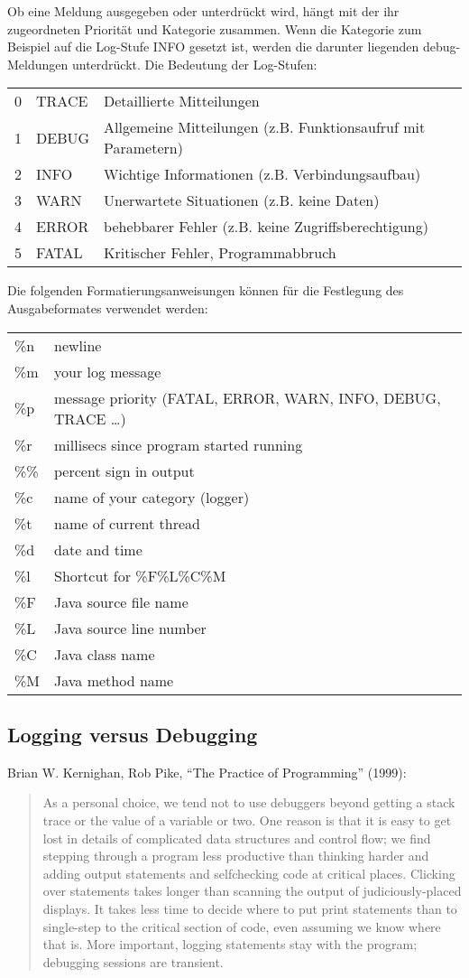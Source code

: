 Ob eine Meldung ausgegeben oder unterdrückt wird, hängt mit der ihr
zugeordneten Priorität und Kategorie zusammen. Wenn die Kategorie zum Beispiel
auf die Log-Stufe INFO gesetzt ist, werden die darunter liegenden
debug-Meldungen unterdrückt.
Die Bedeutung der Log-Stufen:

\begin{tabularx}{\linewidth}{llX}
0 & TRACE & Detaillierte Mitteilungen \\
1 & DEBUG & Allgemeine Mitteilungen (z.B. Funktionsaufruf mit Parametern)\\
2 & INFO & Wichtige Informationen (z.B. Verbindungsaufbau)\\
3 & WARN & Unerwartete Situationen (z.B. keine Daten)\\
4 & ERROR & behebbarer Fehler (z.B. keine Zugriffsberechtigung)\\
5 & FATAL & Kritischer Fehler, Programmabbruch\\
\end{tabularx}

Die folgenden Formatierungsanweisungen können für die Festlegung des
Ausgabeformates verwendet werden:

\begin{tabularx}{\linewidth}{lX}
\%n & newline\\
\%m & your log message\\
\%p & message priority (FATAL, ERROR, WARN, INFO, DEBUG, TRACE \ldots)\\
\%r & millisecs since program started running\\
\%\% & percent sign in output\\
\%c & name of your category (logger)\\
\%t & name of current thread\\
\%d & date and time\\
\%l & Shortcut for \%F\%L\%C\%M\\
\%F & Java source file name\\
\%L & Java source line number\\
\%C & Java class name\\
\%M & Java method name\\
\end{tabularx}
%
\subsection{Logging versus Debugging}
Brian W. Kernighan, Rob Pike, ``The Practice of Programming'' (1999):
\begin{quote}
As a personal choice, we tend not to use debuggers beyond getting a stack trace
or the value of a variable or two. One reason is that it is easy to get lost
in details of complicated data structures and control flow; we  find stepping
through a program less productive than thinking harder and adding output
statements and selfchecking code at critical places. Clicking over statements
takes longer than scanning the output of judiciously-placed displays. It takes
less time to decide where to put print statements than to single-step to the
critical section of code, even assuming we know where that is. More important,
logging statements stay with the program; debugging sessions are
transient.
\end{quote}
%
\newslide
